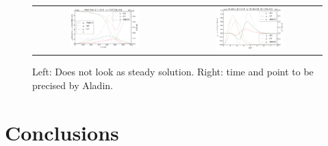 \documentclass[preprint,12pt]{elsarticle}
\newcommand{\figscale}{0.5}
\begin{document}
\begin{figure}[tbh]
  \begin{center}
    \begin{tabular}{cc}
      \includegraphics[width=\figscale\textwidth]{../VFPdata/C7_Aladin_case4_heatflux.png} & 
      \includegraphics[width=\figscale\textwidth]{../VFPdata/C7_Aladin_case4_kinetics.png}
    \end{tabular}
  \caption{  
  Left: Does not look as steady solution. Right: time and point to be precised by Aladin.
  }
  \end{center}
  \label{fig:C7_Aladin_case4}
\end{figure}

\clearpage

\section{Conclusions}
\label{sec:Conclusions}


%
\end{document}
